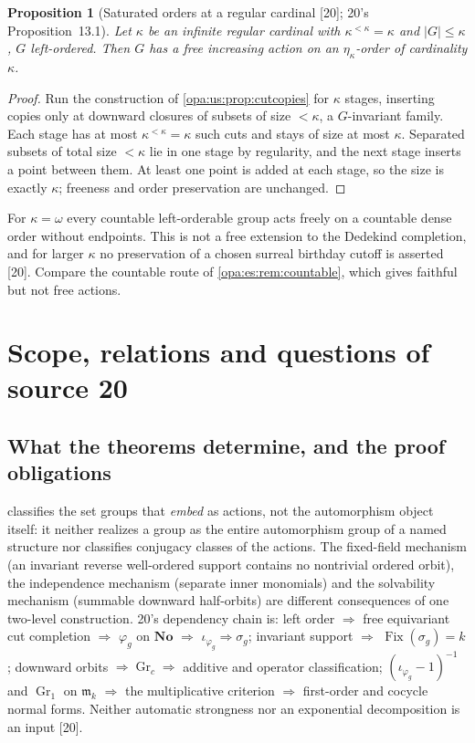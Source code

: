\documentclass[11pt,oneside]{article}
\numberwithin{equation}{section}
\newtheorem{proposition}[proposition]{Proposition}
\theoremstyle{definition}
\theoremstyle{remark}
\newcommand{\No}{\mathbf{No}}
\newcommand{\mm}{\mathfrak m}
\newcommand{\Fix}{\operatorname{Fix}}
\newcommand{\src}[1]{\textup{\textsf{\small[#1]}}}
\begin{document}
\begin{proposition}[Saturated orders at a regular cardinal \src{20}; 20's Proposition~13.1]\label{opa:us:prop:etakappa}
Let $\kappa$ be an infinite regular cardinal with $\kappa^{<\kappa}=\kappa$ and $|G|\le\kappa$, $G$ left-ordered. Then $G$ has a free increasing action on
an $\eta_\kappa$-order of cardinality $\kappa$.
\end{proposition}
\begin{proof}
Run the construction of \cref{opa:us:prop:cutcopies} for $\kappa$ stages, inserting copies only at downward closures of subsets of size $<\kappa$, a
$G$-invariant family. Each stage has at most $\kappa^{<\kappa}=\kappa$ such cuts and stays of size at most $\kappa$. Separated subsets of total size
$<\kappa$ lie in one stage by regularity, and the next stage inserts a point between them. At least one point is added at each stage, so the size is
exactly $\kappa$; freeness and order preservation are unchanged.
\end{proof}

For $\kappa=\omega$ every countable left-orderable group acts freely on a countable dense order without endpoints. This is not a free extension to the
Dedekind completion, and for larger $\kappa$ no preservation of a chosen surreal birthday cutoff is asserted \src{20}. Compare the countable route of
\cref{opa:es:rem:countable}, which gives faithful but not free actions.

\section{Scope, relations and questions of source 20}\label{opa:us:sec:questions}

\subsection{What the theorems determine, and the proof obligations}

 classifies the set groups that \emph{embed} as actions, not the automorphism object itself: it neither realizes a group as the
entire automorphism group of a named structure nor classifies conjugacy classes of the actions. The fixed-field mechanism (an invariant reverse
well-ordered support contains no nontrivial ordered orbit), the independence mechanism (separate inner monomials) and the solvability mechanism
(summable downward half-orbits) are different consequences of one two-level construction. 20's dependency chain is: left order $\Rightarrow$ free
equivariant cut completion $\Rightarrow$ $\varphi_g$ on $\No$ $\Rightarrow$ $\iota_{\varphi_g}\Rightarrow\sigma_g$; invariant support $\Rightarrow$
$\Fix(\sigma_g)=k$; downward orbits $\Rightarrow\operatorname{Gr}_c\Rightarrow$ additive and operator classification; $(\iota_{\varphi_g}-1)^{-1}$ and
$\operatorname{Gr}_1$ on $\mm_k$ $\Rightarrow$ the multiplicative criterion $\Rightarrow$ first-order and cocycle normal forms. Neither automatic strongness
nor an exponential decomposition is an input \src{20}.
\end{document}
